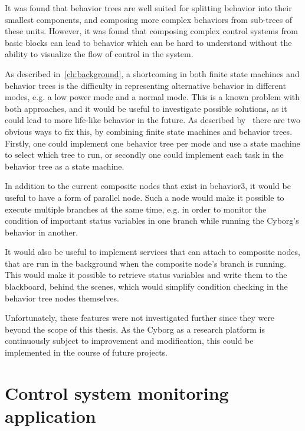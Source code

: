 \documentclass[\rootfolder/main.tex]{subfiles}
\begin{document}
It was found that behavior trees are well suited for splitting behavior into their smallest components, and composing more complex behaviors from sub-trees of these units.
However, it was found that composing complex control systems from basic blocks can lead to behavior which can be hard to understand without the ability to visualize the flow of control in the system.

As described in~\cref{ch:background}, a shortcoming in both finite state machines and behavior trees is the difficulty in representing alternative behavior in different modes, e.g. a low power mode and a normal mode.
This is a known problem with both approaches, and it would be useful to investigate possible solutions, as it could lead to more life-like behavior in the future.
As described by~\cite{Millington2009} there are two obvious ways to fix this, by combining finite state machines and behavior trees.
Firstly, one could implement one behavior tree per mode and use a state machine to select which tree to run, or secondly one could implement each task in the behavior tree as a state machine.

In addition to the current composite nodes that exist in behavior3, it would be useful to have a form of parallel node.
Such a node would make it possible to execute multiple branches at the same time, e.g. in order to monitor the condition of important status variables in one branch while running the Cyborg's behavior in another.

It would also be useful to implement services that can attach to composite nodes, that are run in the background when the composite node's branch is running.
This would make it possible to retrieve status variables and write them to the blackboard, behind the scenes, which would simplify condition checking in the behavior tree nodes themselves.

Unfortunately, these features were not investigated further since they were beyond the scope of this thesis.
As the Cyborg as a research platform is continuously subject to improvement and modification, this could be implemented in the course of future projects.


\section{Control system monitoring application}
\end{document}
